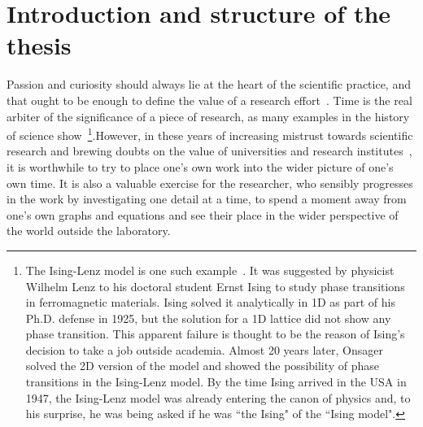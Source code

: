 \section{Introduction and structure of the thesis}

Passion and curiosity should always lie at the heart of the scientific practice, and that ought to be enough to define the value of a research effort~\cite{Weber1917,Shapin2015}. Time is the real arbiter of the significance of a piece of research, as many examples in the history of science show~\cite{Brush1967,Niss2008}\footnote{The Ising-Lenz model is one such example~\cite{Brush1967,Niss2008,Niss2004}. It was suggested by physicist Wilhelm Lenz to his doctoral student Ernst Ising to study phase transitions in ferromagnetic materials. Ising solved it analytically in 1D as part of his Ph.D. defense in 1925, but the solution for a 1D lattice did not show any phase transition. This apparent failure is thought to be the reason of Ising's decision to take a job outside academia. Almost 20 years later, Onsager solved the 2D version of the model and showed the possibility of phase transitions in the Ising-Lenz model. By the time Ising arrived in the USA in 1947, the Ising-Lenz model was already entering the canon of physics and, to his surprise, he was being asked if he was ``the Ising" of the ``Ising model".}.However, in these years of increasing mistrust towards scientific research and brewing doubts on the value of universities and research institutes~\cite{Biesta2002,Biesta2004,Santos2012}, it is worthwhile to try to place one's own work into the wider picture of one's own time. It is also a valuable exercise for the researcher, who sensibly progresses in the work by investigating one detail at a time, to spend a moment away from one's own graphs and equations and see their place in the wider perspective of the world outside the laboratory.\\
